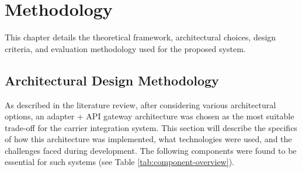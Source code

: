 \documentclass{imc-inf}
\begin{document}
\chapter{Methodology}
\label{ch:methodology}

This chapter details the theoretical framework, architectural choices, design criteria, and evaluation methodology used for the proposed system.

\section{Architectural Design Methodology}
As described in the literature review, after considering various architectural options, an adapter + API gateway architecture was chosen as the most suitable trade-off for the carrier integration system.
This section will describe the specifics of how this architecture was implemented, what technologies were used, and the challenges faced during development.
The following components were found to be essential for such systems (see Table \ref{tab:component-overview}).
\end{document}
